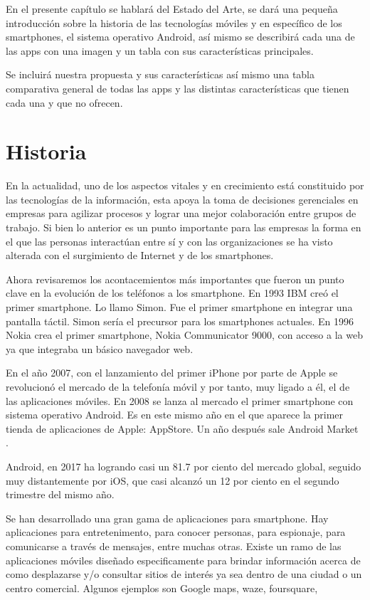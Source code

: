 En el presente capítulo se hablará del Estado del Arte, se dará una pequeña introducción sobre la historia de las tecnologías móviles y en específico de los smartphones, el sistema operativo Android, así mismo se describirá cada una de las apps con una imagen y un tabla con sus características principales.

Se incluirá nuestra propuesta y sus características así mismo una tabla comparativa general de todas las apps y las distintas características que tienen cada una y que no ofrecen.


\section{Historia}
En la actualidad, uno de los aspectos vitales y en crecimiento está constituido por las tecnologías de la información, esta apoya la toma de decisiones gerenciales en empresas para agilizar procesos y lograr una mejor colaboración entre grupos de trabajo.
Si bien lo anterior es un punto importante para las empresas la forma en el que las personas interactúan entre sí y con las organizaciones se ha visto alterada con el surgimiento de Internet y de los smartphones\cite{TI}.

Ahora revisaremos los acontacemientos más importantes que fueron un punto clave en la evolución de los teléfonos a los smartphone.
En 1993 IBM creó el primer smartphone. Lo llamo Simon. Fue el primer smartphone en integrar una pantalla táctil. Simon sería el precursor para los smartphones actuales\cite{Simon}.
En 1996 Nokia crea el primer smartphone, Nokia Communicator 9000, con acceso a la web ya  que integraba un básico navegador web\cite{Nokia}.

En el año 2007, con el lanzamiento del primer iPhone por parte de Apple se revolucionó el mercado 
de la telefonía móvil y por tanto, muy ligado a él, el de las aplicaciones móviles.
En 2008 se lanza al mercado el primer smartphone con sistema operativo Android. Es en este mismo año en el que aparece la primer tienda de aplicaciones de Apple: AppStore. Un año después sale Android 
Market \cite{Rioja}.

Android, en 2017 ha logrando casi un 81.7 por ciento del mercado global, seguido muy distantemente por iOS, 
que casi alcanzó un 12 por ciento en el segundo trimestre del mismo año\cite{IDC}.

Se han desarrollado una gran gama de aplicaciones para smartphone. Hay aplicaciones 
para entretenimento, para conocer personas, para espionaje, para comunicarse a través de mensajes, 
entre muchas otras\cite{playstore}. Existe un ramo de las aplicaciones móviles diseñado especificamente para 
brindar información acerca de como desplazarse y/o consultar sitios de interés ya sea dentro de una ciudad 
o un centro comercial. Algunos ejemplos son Google maps, waze, foursquare, 


